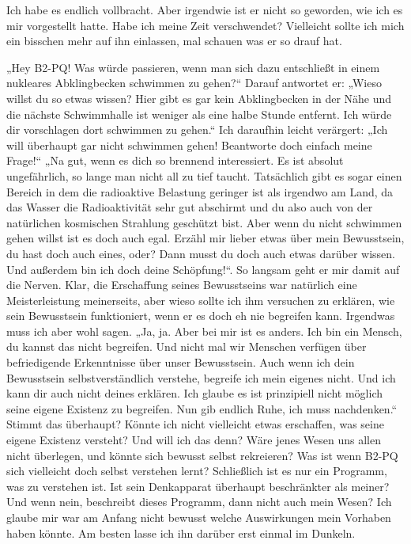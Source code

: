 Ich habe es endlich vollbracht. Aber irgendwie ist er nicht so geworden, wie ich es mir vorgestellt hatte. Habe ich meine Zeit verschwendet? Vielleicht sollte ich mich ein bisschen mehr auf ihn einlassen, mal schauen was er so drauf hat.

„Hey B2-PQ! Was würde passieren, wenn man sich dazu entschließt in einem nukleares Abklingbecken schwimmen zu gehen?“ Darauf antwortet er: „Wieso willst du so etwas wissen? Hier gibt es gar kein Abklingbecken in der Nähe und die nächste Schwimmhalle ist weniger als eine halbe Stunde entfernt. Ich würde dir vorschlagen dort schwimmen zu gehen.“ Ich daraufhin leicht verärgert: „Ich will überhaupt gar nicht schwimmen gehen! Beantworte doch einfach meine Frage!“ „Na gut, wenn es dich so brennend interessiert. Es ist absolut ungefährlich, so lange man nicht all zu tief taucht. Tatsächlich gibt es sogar einen Bereich in dem die radioaktive Belastung geringer ist als irgendwo am Land, da das Wasser die Radioaktivität sehr gut abschirmt und du also auch von der natürlichen kosmischen Strahlung geschützt bist. Aber wenn du nicht schwimmen gehen willst ist es doch auch egal. Erzähl mir lieber etwas über mein Bewusstsein, du hast doch auch eines, oder? Dann musst du doch auch etwas darüber wissen. Und außerdem bin ich doch deine Schöpfung!“. So langsam geht er mir damit auf die Nerven. Klar, die Erschaffung seines Bewusstseins war natürlich eine Meisterleistung meinerseits, aber wieso sollte ich ihm versuchen zu erklären, wie sein Bewusstsein funktioniert, wenn er es doch eh nie begreifen kann. Irgendwas muss ich aber wohl sagen. „Ja, ja. Aber bei mir ist es anders. Ich bin ein Mensch, du kannst das nicht begreifen. Und nicht mal wir Menschen verfügen über befriedigende Erkenntnisse über unser Bewusstsein. Auch wenn ich dein Bewusstsein selbstverständlich verstehe, begreife ich mein eigenes nicht. Und ich kann dir auch nicht deines erklären. Ich glaube es ist prinzipiell nicht möglich seine eigene Existenz zu begreifen. Nun gib endlich Ruhe, ich muss nachdenken.“ Stimmt das überhaupt? Könnte ich nicht vielleicht etwas erschaffen, was seine eigene Existenz versteht? Und will ich das denn? Wäre jenes Wesen uns allen nicht überlegen, und könnte sich bewusst selbst rekreieren? Was ist wenn B2-PQ sich vielleicht doch selbst verstehen lernt? Schließlich ist es nur ein Programm, was zu verstehen ist. Ist sein Denkapparat überhaupt beschränkter als meiner? Und wenn nein, beschreibt dieses Programm, dann nicht auch mein Wesen? Ich glaube mir war am Anfang nicht bewusst welche Auswirkungen mein Vorhaben haben könnte. Am besten lasse ich ihn darüber erst einmal im Dunkeln.